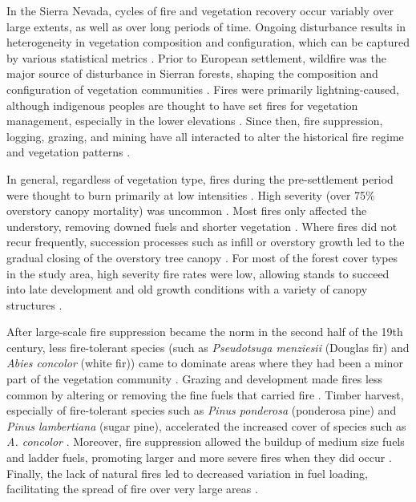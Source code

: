 In the Sierra Nevada, cycles of fire and vegetation recovery occur variably over large extents, as well as over long periods of time. Ongoing disturbance results in heterogeneity in vegetation composition and configuration, which can be captured by various statistical metrics \citep{Monica2008}. Prior to European settlement, wildfire was the major source of disturbance in Sierran forests, shaping the composition and configuration of vegetation communities \citep{SNEP1996a}. Fires were primarily lightning-caused, although indigenous peoples are thought to have set fires for vegetation management, especially in the lower elevations \citep{Anderson1996}. Since then, fire suppression, logging, grazing, and mining have all interacted to alter the historical fire regime and vegetation patterns \citep{Knapp2013,Stephens2015}. 

In general, regardless of vegetation type, fires during the pre-settlement period were thought to burn primarily at low intensities \citep{Skinner1996}. High severity (over 75\% overstory canopy mortality) was uncommon \citep{Mallek2013,Stephens2015}. Most fires only affected the understory, removing downed fuels and shorter vegetation \citep{Stephens2015}. Where fires did not recur frequently, succession processes such as infill or overstory growth led to the gradual closing of the overstory tree canopy \citep{SNEP1996a}. For most of the forest cover types in the study area, high severity fire rates were low, allowing stands to succeed into late development and old growth conditions with a variety of canopy structures \citep{McKenzie2004,Safford2014}.

After large-scale fire suppression became the norm in the second half of the 19th century, less fire-tolerant species (such as \emph{Pseudotsuga menziesii} (Douglas fir) and \emph{Abies concolor} (white fir)) came to dominate areas where they had been a minor part of the vegetation community \citep{Beaty2007,Stephens2015}. Grazing and development made fires less common by altering or removing the fine fuels that carried fire \citep{Hessburg2005}. Timber harvest, especially of fire-tolerant species such as \emph{Pinus ponderosa} (ponderosa pine) and \emph{Pinus lambertiana} (sugar pine), accelerated the increased cover of species such as \emph{A. concolor} \citep{Collins2011}. Moreover, fire suppression allowed the buildup of medium size fuels and ladder fuels, promoting larger and more severe fires when they did occur \citep{Mallek2013}. Finally, the lack of natural fires led to decreased variation in fuel loading, facilitating the spread of fire over very large areas \citep{Beaty2007,Meyer2008}.

